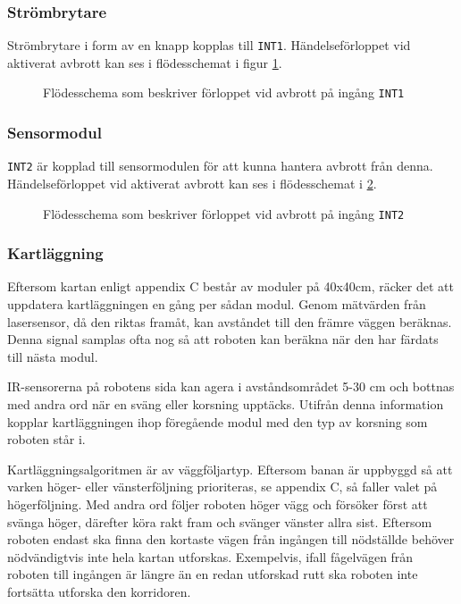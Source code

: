 \documentclass[11pt]{article}
\begin{document}
\begin{flushleft}
\subsubsection {Strömbrytare}
Strömbrytare i form av en knapp kopplas till \verb+INT1+. Händelseförloppet vid aktiverat avbrott kan ses i flödesschemat i figur \ref{avbrott_strombrytare}. 

\begin{figure}[htbp]
\centering
\noindent\resizebox{.6\linewidth}{!}{
	}
	\cprotect\caption{Flödesschema som beskriver förloppet vid avbrott på ingång \verb+INT1+ \label{avbrott_strombrytare}}	
\end{figure}

\subsubsection {Sensormodul} 
\verb+INT2+ är kopplad till sensormodulen för att kunna hantera avbrott från denna. Händelseförloppet vid aktiverat avbrott kan ses i flödesschemat i \ref{avbrott_sensormodul}.

\begin{figure}[htbp]
\centering
\noindent\resizebox{1\linewidth}{!}{
	}
	\cprotect\caption{Flödesschema som beskriver förloppet vid avbrott på ingång \verb+INT2+ \label{avbrott_sensormodul}}	
\end{figure}

\subsubsection{Kartläggning}
Eftersom kartan enligt appendix C består av moduler på 40x40cm, räcker det att uppdatera kartläggningen en gång per sådan modul. Genom mätvärden från lasersensor, då den riktas framåt, kan avståndet till den främre väggen beräknas. Denna signal samplas ofta nog så att roboten kan beräkna när den har färdats till nästa modul. 

IR-sensorerna på robotens sida kan agera i avståndsområdet 5-30 cm och bottnas med andra ord när en sväng eller korsning upptäcks. Utifrån denna information kopplar kartläggningen ihop föregående modul med den typ av korsning som roboten står i. 

Kartläggningsalgoritmen är av väggföljartyp. Eftersom banan är uppbyggd så att varken höger- eller vänsterföljning prioriteras, se appendix C, så faller valet på högerföljning. Med andra ord följer roboten höger vägg och försöker först att svänga höger, därefter köra rakt fram och svänger vänster allra sist. Eftersom roboten endast ska finna den kortaste vägen från ingången till nödställde behöver nödvändigtvis inte hela kartan utforskas. Exempelvis, ifall fågelvägen från roboten till ingången är längre än en redan utforskad rutt ska roboten inte fortsätta utforska den korridoren.


\end{flushleft}
\end{document}
